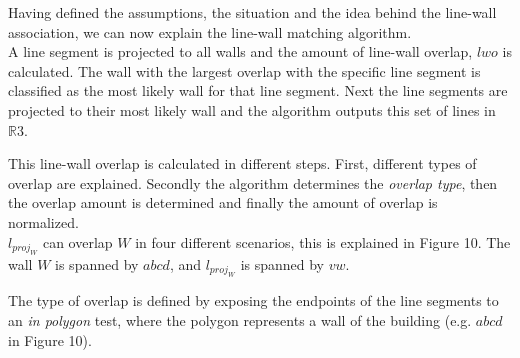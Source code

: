 	Having defined the assumptions, the situation and the idea behind the
	line-wall association, we can now explain the line-wall matching algorithm.\\ 

	A line segment is projected to all walls and the amount of line-wall
	overlap, $lwo$ is calculated. The wall with the largest overlap with the specific line
segment is classified as the most likely wall for that line segment.
	Next the line segments are projected to their most likely wall and the
	algorithm outputs this set of lines in $\mathbb{R}3$. 
	

	This line-wall overlap is calculated in different steps.
	First, different types of overlap are explained. Secondly the algorithm
	determines the \emph{overlap type}, then the overlap amount is determined and
	finally the amount of overlap is normalized.\\

	$l_{proj_W}$ can overlap $W$ in four different scenarios, this is explained
	in Figure 10. The wall $W$ is spanned by $abcd$, and $l_{proj_W}$ is spanned
	by $vw$.
	


		


	The type of overlap is defined by exposing the endpoints of the line
	segments to an \emph{in polygon} test, where the polygon represents a 
	wall of the building (e.g. $abcd$ in Figure 10).


